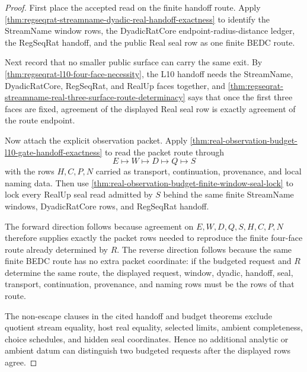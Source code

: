 \begin{proof}
First place the accepted read on the finite handoff route. Apply
\autoref{thm:regseqrat-streamname-dyadic-real-handoff-exactness} to identify
the StreamName window rows, the DyadicRatCore endpoint-radius-distance ledger,
the RegSeqRat handoff, and the public Real seal row as one finite BEDC route.

Next record that no smaller public surface can carry the same exit. By
\autoref{thm:regseqrat-l10-four-face-necessity}, the L10 handoff needs the
StreamName, DyadicRatCore, RegSeqRat, and RealUp faces together, and
\autoref{thm:regseqrat-streamname-real-three-surface-route-determinacy} says
that once the first three faces are fixed, agreement of the displayed Real
seal row is exactly agreement of the route endpoint.

Now attach the explicit observation packet. Apply
\autoref{thm:real-observation-budget-l10-gate-handoff-exactness} to read the
packet route through
$$
E \longmapsto W \longmapsto D \longmapsto Q \longmapsto S
$$
with the rows $H,C,P,N$ carried as transport, continuation, provenance, and
local naming data. Then use
\autoref{thm:real-observation-budget-finite-window-seal-lock} to lock every
RealUp seal read admitted by $S$ behind the same finite StreamName windows,
DyadicRatCore rows, and RegSeqRat handoff.

The forward direction follows because agreement on $E,W,D,Q,S,H,C,P,N$
therefore supplies exactly the packet rows needed to reproduce the finite
four-face route already determined by $R$. The reverse direction follows
because the same finite BEDC route has no extra packet coordinate: if the
budgeted request and $R$ determine the same route, the displayed request,
window, dyadic, handoff, seal, transport, continuation, provenance, and naming
rows must be the rows of that route.

The non-escape clauses in the cited handoff and budget theorems exclude
quotient stream equality, host real equality, selected limits, ambient
completeness, choice schedules, and hidden seal coordinates. Hence no
additional analytic or ambient datum can distinguish two budgeted requests
after the displayed rows agree.
\end{proof}

